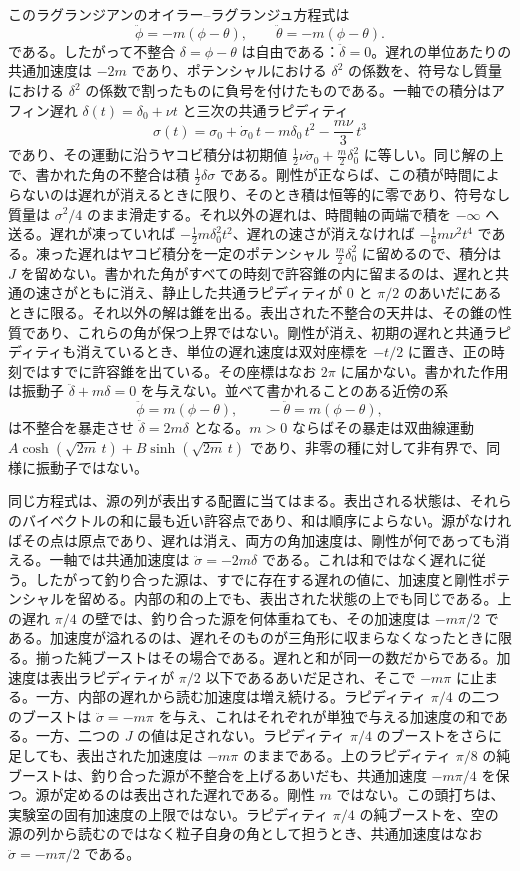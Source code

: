 \documentclass[a4paper]{article}
\begin{document}
このラグランジアンのオイラー--ラグランジュ方程式は
\[
\ddot\phi=-m(\phi-\theta),\qquad \ddot\theta=-m(\phi-\theta).
\]
である。したがって不整合 $\delta=\phi-\theta$ は自由である：$\ddot\delta=0$。遅れの単位あたりの共通加速度は $-2m$ であり、ポテンシャルにおける \(\delta^2\) の係数を、符号なし質量における \(\delta^2\) の係数で割ったものに負号を付けたものである。一軸での積分はアフィン遅れ $\delta(t)=\delta_0+\nu t$ と三次の共通ラピディティ
\[
\sigma(t)=\sigma_0+\dot\sigma_0\,t-m\delta_0\,t^2-\frac{m\nu}{3}\,t^3
\]
であり、その運動に沿うヤコビ積分は初期値 $\tfrac12\nu\dot\sigma_0+\tfrac m2\delta_0^2$ に等しい。同じ解の上で、書かれた角の不整合は積 $\tfrac12\delta\sigma$ である。剛性が正ならば、この積が時間によらないのは遅れが消えるときに限り、そのとき積は恒等的に零であり、符号なし質量は $\sigma^2/4$ のまま滑走する。それ以外の遅れは、時間軸の両端で積を $-\infty$ へ送る。遅れが凍っていれば $-\tfrac12 m\delta_0^2 t^2$、遅れの速さが消えなければ $-\tfrac16 m\nu^2 t^4$ である。凍った遅れはヤコビ積分を一定のポテンシャル $\tfrac m2\delta_0^2$ に留めるので、積分は $J$ を留めない。書かれた角がすべての時刻で許容錐の内に留まるのは、遅れと共通の速さがともに消え、静止した共通ラピディティが $0$ と $\pi/2$ のあいだにあるときに限る。それ以外の解は錐を出る。表出された不整合の天井は、その錐の性質であり、これらの角が保つ上界ではない。剛性が消え、初期の遅れと共通ラピディティも消えているとき、単位の遅れ速度は双対座標を $-t/2$ に置き、正の時刻ではすでに許容錐を出ている。その座標はなお $2\pi$ に届かない。書かれた作用は振動子 $\ddot\delta+m\delta=0$ を与えない。並べて書かれることのある近傍の系
\[
\ddot\phi=m(\phi-\theta),\qquad -\ddot\theta=m(\phi-\theta),
\]
は不整合を暴走させ $\ddot\delta=2m\delta$ となる。$m>0$ ならばその暴走は双曲線運動 $A\cosh(\sqrt{2m}\,t)+B\sinh(\sqrt{2m}\,t)$ であり、非零の種に対して非有界で、同様に振動子ではない。

同じ方程式は、源の列が表出する配置に当てはまる。表出される状態は、それらのバイベクトルの和に最も近い許容点であり、和は順序によらない。源がなければその点は原点であり、遅れは消え、両方の角加速度は、剛性が何であっても消える。一軸では共通加速度は $\ddot\sigma=-2m\delta$ である。これは和ではなく遅れに従う。したがって釣り合った源は、すでに存在する遅れの値に、加速度と剛性ポテンシャルを留める。内部の和の上でも、表出された状態の上でも同じである。上の遅れ $\pi/4$ の壁では、釣り合った源を何体重ねても、その加速度は $-m\pi/2$ である。加速度が溢れるのは、遅れそのものが三角形に収まらなくなったときに限る。揃った純ブーストはその場合である。遅れと和が同一の数だからである。加速度は表出ラピディティが $\pi/2$ 以下であるあいだ足され、そこで $-m\pi$ に止まる。一方、内部の遅れから読む加速度は増え続ける。ラピディティ $\pi/4$ の二つのブーストは $\ddot\sigma=-m\pi$ を与え、これはそれぞれが単独で与える加速度の和である。一方、二つの $J$ の値は足されない。ラピディティ $\pi/4$ のブーストをさらに足しても、表出された加速度は $-m\pi$ のままである。上のラピディティ $\pi/8$ の純ブーストは、釣り合った源が不整合を上げるあいだも、共通加速度 $-m\pi/4$ を保つ。源が定めるのは表出された遅れである。剛性 $m$ ではない。この頭打ちは、実験室の固有加速度の上限ではない。ラピディティ $\pi/4$ の純ブーストを、空の源の列から読むのではなく粒子自身の角として担うとき、共通加速度はなお $\ddot\sigma=-m\pi/2$ である。
\end{document}
